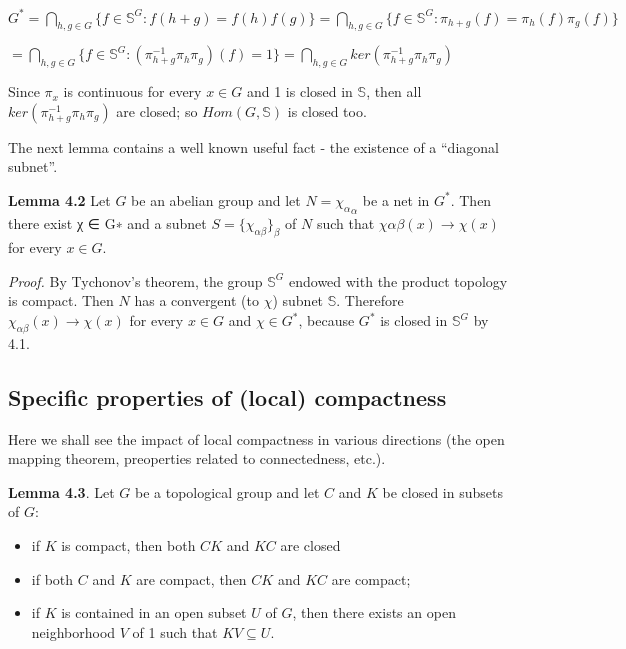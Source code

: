 \documentclass[12pt]{article}
\begin{document}
    $G^* = \bigcap_{h,g \in G} \{f \in \mathbb{S}^G : f(h + g) = f(h)f(g)\} = \bigcap_{h,g \in G} \{f \in \mathbb{S}^G : \pi_{h+g}(f) = \pi_h(f) \pi_g (f)\}$


        $= \bigcap_{h,g \in G} \{f \in \mathbb{S}^G : (\pi^{-1}_{h+g} \pi_h \pi_g)(f) = 1\} = \bigcap_{h,g \in G} ker(\pi^{-1}_{h+g} \pi_h \pi_g)$


Since $\pi_x$ is continuous for every $x \in G$ and {1} is closed in $\mathbb{S}$, then all $ker(\pi^{-1}_{h+g} \pi_h \pi_g)$ are closed; so $Hom (G, \mathbb{S})$
is closed too.


The next lemma contains a well known useful fact - the existence of a “diagonal subnet”.


\textbf{Lemma 4.2} Let $G$ be an abelian group and let $N = {\chi_\alpha}_\alpha$ be a net in $G^*$. Then there exist χ ∈ G∗ and a
subnet $S = \{\chi_{\alpha\beta}\}_\beta$ of $N$ such that $χαβ(x) → χ(x)$ for every $x \in G$.


\emph{Proof.} By Tychonov's theorem, the group $\mathbb{S}^G$ endowed with the product topology is compact. Then $N$ has a
convergent (to $\chi$) subnet $\mathbb{S}$. Therefore $\chi_{\alpha \beta}(x) → \chi(x)$ for every $x \in G$ and $χ \in G^*$, because $G^*$ is closed in $\mathbb{S}^G$
by 4.1.


\subsection{Specific properties of (local) compactness}


Here we shall see the impact of local compactness in various directions (the open mapping theorem, preoperties
related to connectedness, etc.).


\textbf{Lemma 4.3}. Let $G$ be a topological group and let $C$ and $K$ be closed in subsets of $G$:


\begin{itemize}

    \item if $K$ is compact, then both $CK$ and $KC$ are closed
    
    \item if both $C$ and $K$ are compact, then $CK$ and $KC$ are compact;

    \item if $K$ is contained in an open subset $U$ of $G$, then there exists an open neighborhood $V$ of 1 such that
    $KV \subseteq U$.
    
\end{itemize}
\end{document}
